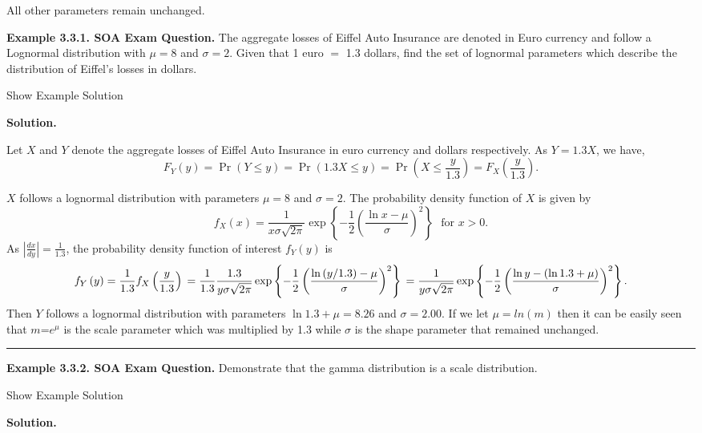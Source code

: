 \documentclass[]{book}
\theoremstyle{definition}
\theoremstyle{definition}
\theoremstyle{definition}
\theoremstyle{remark}
\begin{document}
All other parameters remain unchanged.

\textbf{Example 3.3.1. SOA Exam Question.} The aggregate losses of
Eiffel Auto Insurance are denoted in Euro currency and follow a
Lognormal distribution with \(\mu = 8\) and \(\sigma = 2\). Given that 1
euro \(=\) 1.3 dollars, find the set of lognormal parameters which
describe the distribution of Eiffel's losses in dollars.

Show Example Solution

\hypertarget{toggleExampleLoss.3.1}{}
\textbf{Solution.}

Let \(X\) and \(Y\) denote the aggregate losses of Eiffel Auto Insurance
in euro currency and dollars respectively. As \(Y = 1.3X\), we have,
\[F_{Y}\left( y \right) = \Pr\left( Y \leq y \right) = \Pr\left( 1.3X \leq y \right) = \Pr\left( X \leq \frac{y}{1.3} \right) = F_{X}\left( \frac{y}{1.3} \right).\]

\(X\) follows a lognormal distribution with parameters \(\mu = 8\) and
\(\sigma = 2\). The probability density function of \(X\) is given by
\[f_{X}\left( x \right) = \frac{1}{x \sigma \sqrt{2\pi}}\exp \left\{- \frac{1}{2}\left( \frac{\ln x - \mu}{\sigma} \right)^{2}\right\} \ \ \ \text{for } x > 0.\]
As \(\left| \frac{dx}{dy} \right| = \frac{1}{1.3}\), the probability
density function of interest \(f_{Y}(y)\) is
\[f_{Y}\left( y \right) = \frac{1}{1.3}f_{X}\left( \frac{y}{1.3} \right) \\
= \frac{1}{1.3}\frac{1.3}{y \sigma \sqrt{2\pi}}\exp \left\{- \frac{1}{2}\left( \frac{\ln\left( y/1.3 \right) - \mu}{\sigma} \right)^{2}\right\} \\
= \frac{1}{y \sigma\sqrt{2\pi}}\exp \left\{- \frac{1}{2}\left( \frac{\ln y - \left( \ln 1.3 + \mu \right)}{\sigma} \right)^{2}\right\}.\]
Then \(Y\) follows a lognormal distribution with parameters
\(\ln 1.3 + \mu = 8.26\) and \(\sigma = 2.00\). If we let
\(\mu = ln(m)\) then it can be easily seen that \(m\)=\(e^{\mu}\) is the
scale parameter which was multiplied by 1.3 while \(\sigma\) is the
shape parameter that remained unchanged.

\begin{center}\rule{0.5\linewidth}{\linethickness}\end{center}

\textbf{Example 3.3.2. SOA Exam Question.} Demonstrate that the gamma
distribution is a scale distribution.

Show Example Solution

\hypertarget{toggleExampleLoss.3.2}{}
\textbf{Solution.}
\end{document}
